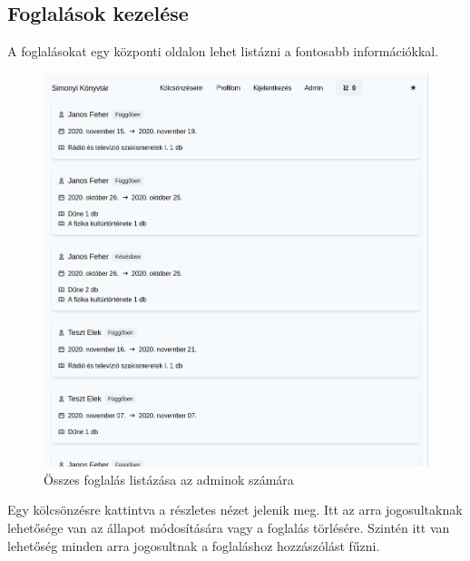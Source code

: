 \subsection{Foglalások kezelése}

A foglalásokat egy központi oldalon lehet listázni a fontosabb információkkal.

\begin{figure}[!ht]
  \centering
  \includegraphics[width=150mm, keepaspectratio]{figures/order-admin-list.png}
  \caption{Összes foglalás listázása az adminok számára}
  \label{fig:OrderAdminList}
\end{figure}

Egy kölcsönzésre kattintva a részletes nézet jelenik meg. Itt az arra jogosultaknak lehetősége van az állapot módosítására vagy
a foglalás törlésére. Szintén itt van lehetőség minden arra jogosultnak a foglaláshoz hozzászólást fűzni.

